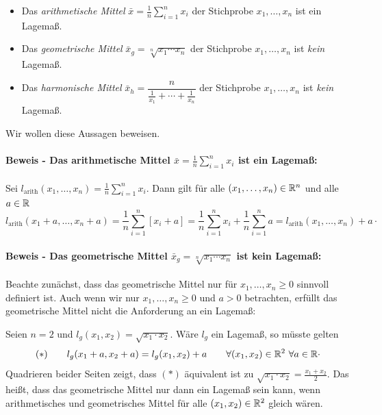 \begin{bsp}
    \begin{itemize}
        \item Das \emph{arithmetische Mittel} $\bar x = \frac{1}{n}\sum_{i=1}^n x_i$ der Stichprobe $x_1,\dots,x_n$ ist ein \gls{Lagemaß}.
        \item Das \emph{geometrische Mittel} $\bar x_g = \sqrt[n]{x_1\cdots x_n}$ der Stichprobe $x_1,\dots,x_n$ ist \emph{kein} \gls{Lagemaß}.
        \item Das \emph{harmonische Mittel} $\bar x_h = \dfrac{n}{\frac{1}{x_1}+\cdots+\frac{1}{x_n}}$ der Stichprobe $x_1,\dots,x_n$ ist \emph{kein} \gls{Lagemaß}.
    \end{itemize}

    \noindent Wir wollen diese Aussagen beweisen.

    \smallskip

    \paragraph{Beweis - Das arithmetische Mittel $\bar x=\frac{1}{n}\sum_{i=1}^n x_i$ ist ein Lagemaß:}

    Sei $l_{\mathrm{arith}}(x_1,\dots,x_n) = \frac1n\sum_{i=1}^n x_i$.
    Dann gilt für alle $(x_1,\dots,x_n)\in\mathbb{R}^n$ und alle $a\in\mathbb{R}$
    \[
        l_{\mathrm{arith}}(x_1+a,\dots,x_n+a) = \frac1n \sum_{i=1}^n [x_i+a] = \frac1n\sum_{i=1}^n x_i + \frac1n\sum_{i=1}^n a = l_{\mathrm{arith}}(x_1,\dots,x_n) + a \cdot
    \]

    \smallskip

    \paragraph{Beweis - Das geometrische Mittel $\bar x_g = \sqrt[n]{x_1\cdots x_n}$ ist kein Lagemaß:}

    Beachte zunächst, dass das geometrische Mittel nur für $x_1,\dots,x_n\geq 0$ sinnvoll definiert ist.
    Auch wenn wir nur $x_1,\dots,x_n\geq 0$ und $a>0$ betrachten, erfüllt das geometrische Mittel nicht die Anforderung an ein \gls{Lagemaß}:

    Seien $n=2$ und $l_g(x_1,x_2)=\sqrt{x_1\cdot x_2}$.
    Wäre $l_g$ ein \gls{Lagemaß}, so müsste gelten
    \[
        (*) \qquad l_g(x_1+a,x_2+a) = l_g(x_1,x_2)+a \qquad \forall (x_1,x_2)\in\mathbb{R}^2 \ \forall a\in\mathbb{R} \cdot
    \]
    Quadrieren beider Seiten zeigt, dass $(*)$ äquivalent ist zu $\sqrt{x_1\cdot x_2} = \frac{x_1+x_2}{2}$.
    Das heißt, dass das geometrische Mittel nur dann ein \gls{Lagemaß} sein kann, wenn arithmetisches und geometrisches Mittel für alle $(x_1,x_2)\in\mathbb{R}^2$ gleich wären.


\end{bsp}

